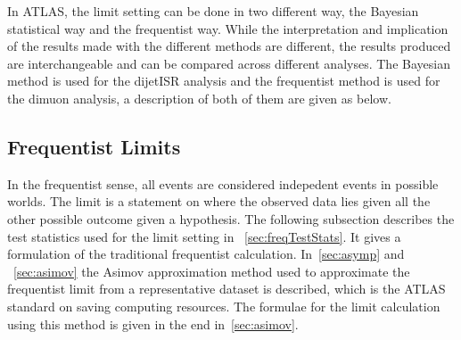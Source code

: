 In ATLAS, the limit setting can be done in two different way, the Bayesian statistical way and the frequentist way. While the interpretation and implication of the results made with the different methods are different, the results produced are interchangeable and can be compared across different analyses. 
The Bayesian method is used for the dijetISR analysis and the frequentist method is used for the dimuon analysis, a description of both of them are given as below.

%



\subsection{Frequentist Limits}
\label{sec:freq}
In the frequentist sense, all events are considered indepedent events in possible worlds. The limit is a statement on where the observed data lies given all the other possible outcome given a hypothesis. 
The following subsection describes the test statistics used for the limit setting in ~\ref{sec:freqTestStats}. It gives a formulation of the traditional frequentist calculation. In~\ref{sec:asymp} and ~\ref{sec:asimov} the Asimov approximation method used to approximate the frequentist limit from a representative dataset is described, which is the ATLAS standard on saving computing resources. The formulae for the limit calculation using this method is given in the end
in~\ref{sec:asimov}.

